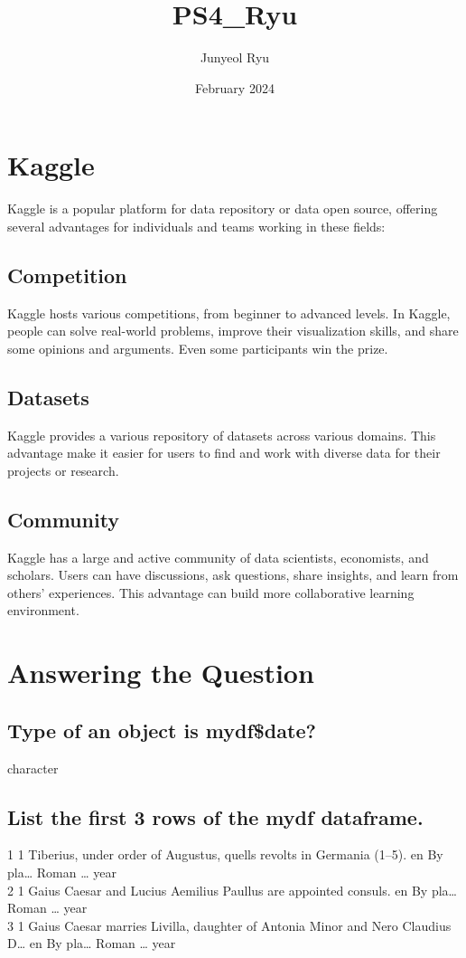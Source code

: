 \documentclass{article}
\title{PS4\_Ryu}
\author{Junyeol Ryu}
\date{February 2024}
\begin{document}
\maketitle

\section{Kaggle}

Kaggle is a popular platform for data repository or data open source, offering several advantages for individuals and teams working in these fields:

\subsection{Competition}
Kaggle hosts various competitions, from beginner to advanced levels. In Kaggle, people can solve real-world problems, improve their visualization skills, and share some opinions and arguments. Even some participants win the prize. 

\subsection{Datasets}
Kaggle provides a various repository of datasets across various domains. This advantage make it easier for users to find and work with diverse data for their projects or research. 

\subsection{Community}
Kaggle has a large and active community of data scientists, economists, and scholars. Users can have discussions, ask questions, share insights, and learn from others' experiences. This advantage can build more collaborative learning environment.


\section{Answering the Question}
\subsection{Type of an object is mydf\$date?}
character

\subsection{List the first 3 rows of the mydf dataframe.}
1 1     Tiberius, under order of Augustus, quells revolts in Germania (1–5).         en    By pla… Roman … year   
\\
2 1     Gaius Caesar and Lucius Aemilius Paullus are appointed consuls.              en    By pla… Roman … year   
\\
3 1     Gaius Caesar marries Livilla, daughter of Antonia Minor and Nero Claudius D… en    By pla… Roman … year   
\end{document}

